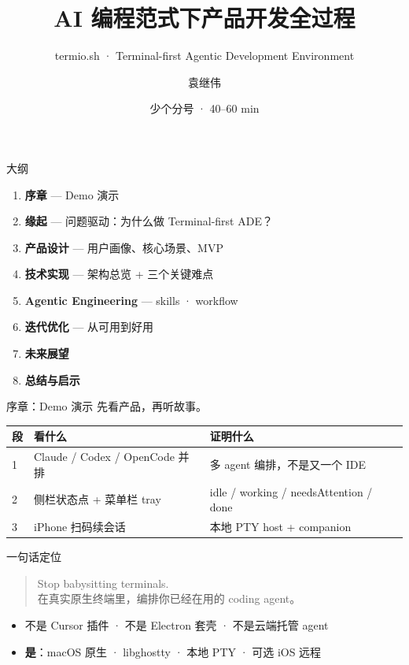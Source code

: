 \documentclass[aspectratio=169,10pt,UTF8]{ctexbeamer}
\title{AI 编程范式下产品开发全过程}
\subtitle{termio.sh · Terminal-first Agentic Development Environment}
\author{袁继伟}
\date{少个分号 · 40--60 min}
\institute{\url{https://termio.sh}}
\begin{document}
\begin{frame}[plain]
  \titlepage
\end{frame}

\begin{frame}{大纲}
  \begin{enumerate}
    \item \textbf{序章} — Demo 演示
    \item \textbf{缘起} — 问题驱动：为什么做 Terminal-first ADE？
    \item \textbf{产品设计} — 用户画像、核心场景、MVP
    \item \textbf{技术实现} — 架构总览 + 三个关键难点
    \item \textbf{Agentic Engineering} — skills · workflow
    \item \textbf{迭代优化} — 从可用到好用
    \item \textbf{未来展望}
    \item \textbf{总结与启示}
  \end{enumerate}
\end{frame}

\begin{frame}{序章：Demo 演示}
  先看产品，再听故事。

  \vspace{0.8em}
  \begin{tabular}{@{}llp{5.5cm}@{}}
    \toprule
    段 & 看什么 & 证明什么 \\
    \midrule
    1 & Claude / Codex / OpenCode 并排 & 多 agent 编排，不是又一个 IDE \\
    2 & 侧栏状态点 + 菜单栏 tray & idle / working / needsAttention / done \\
    3 & iPhone 扫码续会话 & 本地 PTY host + companion \\
    \bottomrule
  \end{tabular}
\end{frame}

\begin{frame}{一句话定位}
  \begin{quote}
    \Large Stop babysitting terminals.\\[0.4em]
    \normalsize 在真实原生终端里，编排你已经在用的 coding agent。
  \end{quote}
  \vspace{0.6em}
  \begin{itemize}
    \item 不是 Cursor 插件 · 不是 Electron 套壳 · 不是云端托管 agent
    \item \textbf{是}：macOS 原生 · libghostty · 本地 PTY · 可选 iOS 远程
  \end{itemize}
\end{frame}
\end{document}
